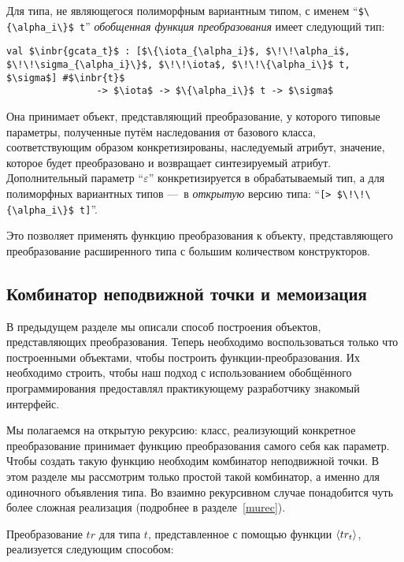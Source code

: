 Для типа, не являющегося полиморфным вариантным типом, с именем ``\lstinline|$\{\alpha_i\}$ t|'' \emph{обобщенная функция преобразования} имеет следующий тип:

\begin{lstlisting}
val $\inbr{gcata_t}$ : [$\{\iota_{\alpha_i}$, $\!\!\alpha_i$, $\!\!\sigma_{\alpha_i}\}$, $\!\!\iota$, $\!\!\{\alpha_i\}$ t, $\sigma$] #$\inbr{t}$ 
                -> $\iota$ -> $\{\alpha_i\}$ t -> $\sigma$
\end{lstlisting}

Она принимает объект, представляющий преобразование, у которого типовые параметры, полученные путём наследования от базового класса, соответствующим образом конкретизированы, наследуемый атрибут, значение, которое будет преобразовано и возвращает синтезируемый атрибут.
Дополнительный параметр ``$\varepsilon$'' конкретизируется в обрабатываемый тип, а 
для полиморфных вариантных типов ---~в \emph{открытую}
версию типа:  ``\lstinline|[> $\!\!\{\alpha_i\}$ t]|''. 

Это позволяет применять функцию преобразования к объекту, представляющего преобразование расширенного типа с
большим
количеством конструкторов.


\subsection{Комбинатор неподвижной точки и мемоизация}
\label{memofix}

В предыдущем разделе мы описали способ построения объектов, представляющих преобразования. Теперь необходимо воспользоваться только что построенными объектами, чтобы построить функции-преобразования. Их необходимо строить, чтобы наш подход с использованием обобщённого программирования предоставлял практикующему разработчику знакомый интерфейс.

Мы полагаемся  на открытую рекурсию: класс, реализующий конкретное преобразование принимает функцию преобразования самого себя как параметр.
Чтобы создать такую функцию необходим комбинатор неподвижной точки. В  этом разделе
мы рассмотрим только простой такой комбинатор, а именно для одиночного объявления типа.
Во взаимно рекурсивном случае понадобится чуть более сложная реализация (подробнее в 
разделе~\ref{murec}).


Преобразование $tr$ для типа $t$, представленное с помощью функции $\left<tr_{t}\right>$, реализуется следующим способом:

